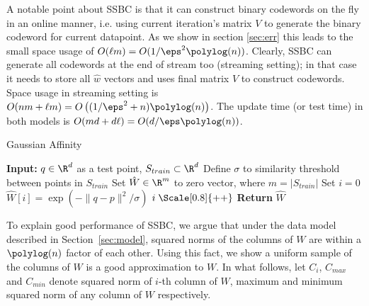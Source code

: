 \documentclass{sig-alternate}
\begin{document}
A notable point about SSBC is that it can construct binary codewords on the fly in an online manner, i.e. using current iteration's matrix $V$ to generate the binary codeword for current datapoint. 
As we show in section \ref{sec:err} this leads to the small space usage of $O(\ell m) = O(1/\eps^2 \polylog(n))$. Clearly, SSBC can generate all codewords at the end of stream too (streaming setting); in that case it needs to store all $\hat w$ vectors and uses final matrix $V$ to construct codewords. Space usage in streaming setting is $O(n m + \ell m) = O\left((1/\eps^2 + n)\polylog(n)\right)$.
The update time (or test time) in both models is $O(md + d\ell) = O(d/\eps \polylog(n))$. 

\begin{algorithm}
\caption{\label{alg:ha} Gaussian Affinity}
\begin{algorithmic}
\STATE \textbf{Input:} $q \in \R^{d}$ as a test point, $S_{train} \subset \R^d$
\STATE Define $\sigma$ to similarity threshold between points in $S_{train}$
\STATE Set $\hat W \in \R^m$ to zero vector, where $m = |S_{train}|$
\STATE Set $i = 0$
  \STATE $\hat W[i] = \exp(-\|q - p\|^2/\sigma)$
  \STATE $i\; \Scale[0.8]{++}$
\ENDFOR
\STATE \textbf{Return} $\hat{W}$
\end{algorithmic}
\end{algorithm}

To explain good performance of SSBC, we argue that under the data model described in Section~\ref{sec:model}, squared norms of the columns of $W$ are within a $\polylog(n)$ factor of each other. Using this fact, we show a uniform sample of the columns of $W$ is a good approximation to $W$. In what follows, let $C_i$, $C_{max}$ and $C_{min}$ denote squared norm of $i$-th column of $W$, maximum and minimum squared norm of any column of $W$ respectively.
\end{document}
